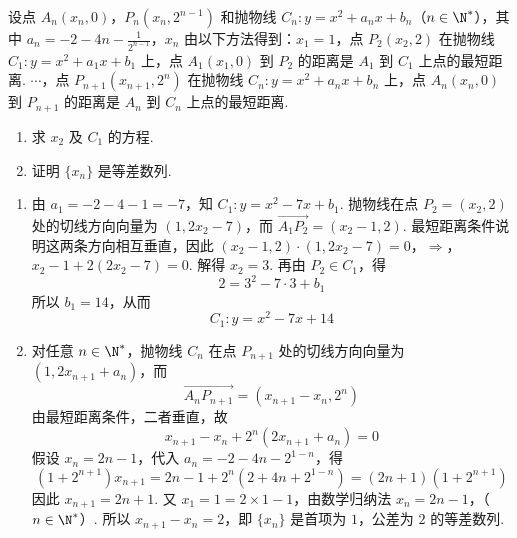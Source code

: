 \begin{problem}
设点 \(A_{n}(x_{n},0)\)，\(P_{n}(x_{n},2^{n - 1})\) 和抛物线 \(C_n: y = x^{2} + a_n x + b_n\)（\(n \in \N^{*}\)），其中 \(a_{n} = -2 - 4n - \frac{1}{2^{n-1}}\)，\(x_{n}\) 由以下方法得到：\(x_{1} = 1\)，点 \(P_{2}(x_{2},2)\) 在抛物线 \(C_{1}: y = x^{2} + a_{1}x + b_{1}\) 上，点 \(A_{1}(x_{1},0)\) 到 \(P_{2}\) 的距离是 \(A_{1}\) 到 \(C_{1}\) 上点的最短距离. \(\cdots\)，点 \(P_{n + 1}(x_{n + 1},2^{n})\) 在抛物线 \(C_{n}: y = x^{2} + a_{n}x + b_{n}\) 上，点 \(A_{n}(x_{n},0)\) 到 \(P_{n + 1}\) 的距离是 \(A_{n}\) 到 \(C_{n}\) 上点的最短距离.
\begin{enumerate}
\item 求 \(x_{2}\) 及 \(C_{1}\) 的方程.
\item 证明 \(\{x_{n}\}\) 是等差数列.
\end{enumerate}

\begin{solution}
\begin{enumerate}
\item 由 \(a_1=-2-4-1=-7\)，知 \(C_1:y=x^2-7x+b_1\). 抛物线在点 \(P_2=(x_2,2)\) 处的切线方向向量为 \((1,2x_2-7)\)，而
\(\overrightarrow{A_1P_2}=(x_2-1,2)\). 最短距离条件说明这两条方向相互垂直，因此
\((x_2-1,2)\cdot(1,2x_2-7)=0\)，\(\Longrightarrow\)，\(x_2-1+2(2x_2-7)=0\).
解得 \(x_2=3\). 再由 \(P_2\in C_1\)，得
\[
2=3^2-7\cdot3+b_1
\]
所以 \(b_1=14\)，从而
\[
C_1:y=x^2-7x+14
\]

\item 对任意 \(n\in\N^*\)，抛物线 \(C_n\) 在点 \(P_{n+1}\) 处的切线方向向量为
\(\left(1,2x_{n+1}+a_n\right)\)，而
\[
\overrightarrow{A_nP_{n+1}}=\left(x_{n+1}-x_n,2^n\right)
\]
由最短距离条件，二者垂直，故
\[
x_{n+1}-x_n+2^n(2x_{n+1}+a_n)=0
\]
假设 \(x_n=2n-1\)，代入 \(a_n=-2-4n-2^{1-n}\)，得
\[
\left(1+2^{n+1}\right)x_{n+1}
=2n-1+2^n\left(2+4n+2^{1-n}\right)
=(2n+1)\left(1+2^{n+1}\right)
\]
因此 \(x_{n+1}=2n+1\). 又 \(x_1=1=2\times1-1\)，由数学归纳法
\(x_n=2n-1\)，（\(n\in\N^*\)）.
所以 \(x_{n+1}-x_n=2\)，即 \(\{x_n\}\) 是首项为 \(1\)，公差为 \(2\) 的等差数列.
\end{enumerate}
\end{solution}
\end{problem}
